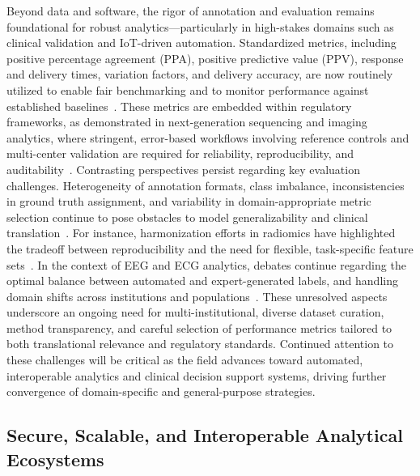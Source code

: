 \documentclass[sigconf]{acmart}
\begin{document}
Beyond data and software, the rigor of annotation and evaluation remains foundational for robust analytics---particularly in high-stakes domains such as clinical validation and IoT-driven automation. Standardized metrics, including positive percentage agreement (PPA), positive predictive value (PPV), response and delivery times, variation factors, and delivery accuracy, are now routinely utilized to enable fair benchmarking and to monitor performance against established baselines~\cite{ref44,ref45,ref46,ref50,ref54,ref57,ref60,ref61,ref62,ref64,ref65,ref79,ref80,ref100,ref106}. These metrics are embedded within regulatory frameworks, as demonstrated in next-generation sequencing and imaging analytics, where stringent, error-based workflows involving reference controls and multi-center validation are required for reliability, reproducibility, and auditability~\cite{ref50,ref60,ref61,ref44,ref45,ref54}. Contrasting perspectives persist regarding key evaluation challenges. Heterogeneity of annotation formats, class imbalance, inconsistencies in ground truth assignment, and variability in domain-appropriate metric selection continue to pose obstacles to model generalizability and clinical translation~\cite{ref61,ref62,ref64,ref65,ref79,ref106}. For instance, harmonization efforts in radiomics have highlighted the tradeoff between reproducibility and the need for flexible, task-specific feature sets~\cite{ref44,ref45,ref46}. In the context of EEG and ECG analytics, debates continue regarding the optimal balance between automated and expert-generated labels, and handling domain shifts across institutions and populations~\cite{ref101,ref102,ref103}. These unresolved aspects underscore an ongoing need for multi-institutional, diverse dataset curation, method transparency, and careful selection of performance metrics tailored to both translational relevance and regulatory standards. Continued attention to these challenges will be critical as the field advances toward automated, interoperable analytics and clinical decision support systems, driving further convergence of domain-specific and general-purpose strategies.

\subsection{Secure, Scalable, and Interoperable Analytical Ecosystems}
\end{document}
